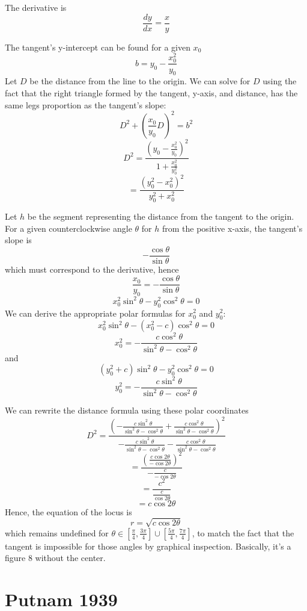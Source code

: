 \documentclass{book}
\begin{document}
The derivative is
$$\frac{dy}{dx} = \frac{x}{y}$$

The tangent's y-intercept can be found for a given $x_0$
$$b = y_0 - \frac{x_0^2}{y_0}$$
Let $D$ be the distance from the line to the origin. We can solve for $D$ using the fact that the right triangle formed by the tangent, y-axis, and distance, has the same legs proportion as the tangent's slope:
$$D^2 + \left( \frac{x_0}{y_0} D \right)^2 = b^2$$
$$D^2 = \frac{\left( y_0 - \frac{x_0^2}{y_0} \right)^2}{1 + \frac{x_0^2}{y_0^2}}$$
$$= \frac{\left( y_0^2 - x_0^2 \right)^2}{y_0^2 + x_0^2}$$

Let $h$ be the segment representing the distance from the tangent to the origin. For a given counterclockwise angle $\theta$ for $h$ from the positive x-axis, the tangent's slope is
$$-\frac{\cos \theta}{\sin \theta}$$
which must correspond to the derivative, hence
$$\frac{x_0}{y_0} = -\frac{\cos \theta}{\sin \theta}$$
$$x_0^2 \sin^2 \theta - y_0^2 \cos^2 \theta = 0$$
We can derive the appropriate polar formulas for $x^2_0$ and $y^2_0$:
$$x_0^2 \sin^2 \theta - (x_0^2 - c) \cos^2 \theta = 0$$
$$x_0^2 = -\frac{c \cos^2 \theta}{\sin^2 \theta - \cos^2 \theta}$$
and
$$(y_0^2 + c) \sin^2 \theta - y_0^2 \cos^2 \theta = 0$$
$$y_0^2 = -\frac{c \sin^2 \theta}{\sin^2 \theta - \cos^2 \theta}$$

We can rewrite the distance formula using these polar coordinates
$$D^2 = \frac{\left( -\frac{c \sin^2 \theta}{\sin^2 \theta - \cos^2 \theta} + \frac{c \cos^2 \theta}{\sin^2 \theta - \cos^2 \theta} \right)^2}{-\frac{c \sin^2 \theta}{\sin^2 \theta - \cos^2 \theta} - \frac{c \cos^2 \theta}{\sin^2 \theta - \cos^2 \theta}}$$
$$= \frac{\left( \frac{c \cos 2\theta}{-\cos 2\theta} \right)^2}{-\frac{c}{- \cos 2\theta}}$$
$$= \frac{c^2}{\frac{c}{\cos 2\theta}}$$
$$= c \cos 2\theta$$
Hence, the equation of the locus is
$$r = \sqrt{c \cos 2\theta}$$
which remains undefined for $\theta \in [\frac{\pi}{4}, \frac{3\pi}{4}] \cup [\frac{5\pi}{4}, \frac{7\pi}{4}]$, to match the fact that the tangent is impossible for those angles by graphical inspection. Basically, it's a figure 8 without the center.

\chapter{Putnam 1939}
\end{document}

